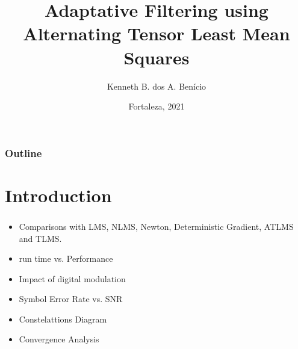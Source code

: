 \documentclass[10pt]{beamer}
\title[Short Title]{%
    Adaptative Filtering using Alternating Tensor Least Mean Squares 
    \vspace{0.5cm}
}
\author{Kenneth B. dos A. Benício}
\institute{
        \textit{Department of Teleinformatics Engineering}\\
        \textit{Federal University of Ceará}
        \vspace{0.5cm}
}
\date[Fortaleza, 2021]{%
    Fortaleza, 2021
}
\begin{document}

{
    \maketitle
}

 \begin{frame}
 \frametitle{Outline}
 \tableofcontents
 \end{frame}

\section{Introduction}
\begin{frame}
    \frametitle{\insertsection}
    \begin{itemize}
        \justifying
        \item Comparisons with LMS, NLMS, Newton, Deterministic Gradient, ATLMS and TLMS.
        \item run time vs. Performance
        \item Impact of digital modulation
        \item Symbol Error Rate vs. SNR
        \item Constelattions Diagram 
        \item Convergence Analysis 
    \end{itemize}
\end{frame}

\end{document}
